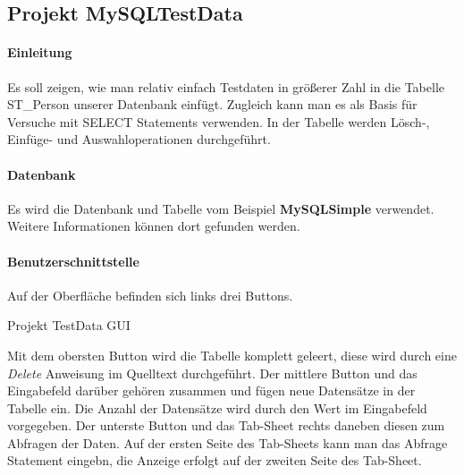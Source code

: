 \subsection{Projekt MySQLTestData}
\paragraph{Einleitung}
Es soll zeigen, wie man relativ einfach Testdaten in größerer Zahl in die Tabelle ST\_Person unserer Datenbank einfügt. Zugleich kann man es als Basis für Versuche mit SELECT Statements verwenden. In der Tabelle werden Lösch-, Einfüge- und Auswahloperationen durchgeführt.

\paragraph{Datenbank}
Es wird die Datenbank und Tabelle vom Beispiel \textbf{MySQLSimple} verwendet. Weitere Informationen können dort gefunden werden.

\paragraph{Benutzerschnittstelle}
Auf der Oberfläche befinden sich links drei Buttons. 
\caption{Projekt TestData GUI}
\label{fig:MySQLTestData01} 
Mit dem obersten Button wird die Tabelle komplett geleert, diese wird durch eine \emph{Delete} Anweisung im Quelltext durchgeführt. 
Der mittlere Button und das Eingabefeld darüber gehören zusammen und fügen neue Datensätze in der Tabelle ein. Die Anzahl der Datensätze wird durch den Wert im Eingabefeld vorgegeben.
Der unterste Button und das Tab-Sheet rechts daneben diesen zum Abfragen der Daten. Auf der ersten Seite des Tab-Sheets kann man das Abfrage Statement eingebn, die Anzeige erfolgt auf der zweiten Seite des Tab-Sheet.

